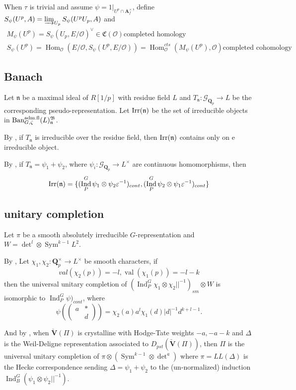 \documentclass[leqno]{amsart}
\newcommand{\smat}[1]{\left( \begin{smallmatrix} #1 \end{smallmatrix} \right)}
\newcommand{\Gp}{\mathcal{G}_{\Qp}} %
\newcommand{\Ban}{\textnormal{Ban}^{\textnormal{adm.fl}}}
\newcommand{\Irr}{\textnormal{Irr}}
\newcommand{\V}{\check{\mathbf{V}}} %
\DeclareMathOperator{\Sym}{Sym}
\DeclareMathOperator{\val}{val}
\newcommand{\Qp}{\mathbf{Q}_p}
\newcommand{\A}{\mathbf A}
\newcommand{\oo}{\mathcal O}
\newcommand{\1}{\mathbf{1}}
\newcommand{\fC}{\mathfrak C}
\newcommand{\B}{\mathfrak B}
\newcommand{\fn}{\mathfrak n}
\DeclareMathOperator{\Hom}{Hom}
\DeclareMathOperator{\Ind}{Ind}
\theoremstyle{definition}
\theoremstyle{remark}
\begin{document}
When $\tau$ is trivial and assume $\psi=1|_{U^p\cap \A_f^\times}$, define
$S_\psi(U^p,A)=\varinjlim_{U_p}S_\psi(U^pU_p,A)$ and
\begin{gather*}
	M_\psi(U^p)=S_\psi(U_p,E/\oo)^{\vee}\in \fC(\oo) \text{completed homology}\\
	S_\psi(U^p)=\Hom_{\oo}(E/\oo, S_\psi(U^p,E/\oo))=
	\Hom_{\oo}^{cts}(M_\psi(U^p), \oo) \text{completed cohomology}
\end{gather*}

\subsection{Banach}

Let $\fn$ be a maximal ideal of  $R[1/p]$
with residue field  $L$ and 
$T_\fn\colon \Gp\to L$ 
be the corresponding pseudo-representation.
Let  $\Irr(\fn)$
be the set of irreducible objects in  $\Ban_{G,\zeta}(L)^\B_{\fn}$.


By \cite[Cor 8.14]{pask}, 
if $T_\fn$ is irreducible over the residue field, 
then $\Irr(\fn)$ contains only on e irreducible object.

By \cite[Cor 8.15]{pask}, 
if $T_\fn=\psi_1+\psi_2$,
where  $\psi_i\colon \Gp\to L^\times$
are continuous homomorphisms, then  
\[
	\Irr(\fn)=\{(\Ind_P^G\psi_1\otimes\psi_2\varepsilon^{-1})_{cont},
	(\Ind_P^G\psi_2\otimes\psi_1\varepsilon^{-1})_{cont}\}
\]

\subsection{unitary completion}

Let $\pi$ be a smooth absolutely irreducible
$G$-representation
and  $W=\det^l\otimes\Sym^{k-1}L^2$. 

By \cite[Thm 12.3]{pask}, 
Let $\chi_1,\chi_2\colon \Qp^\times\to L^\times$
be smooth characters, 
if 
\[
	val(\chi_2(p))=-l, \val(\chi_1(p))=-l-k
\]
then the universal unitary completion of
$(\Ind_P^G\chi_1\otimes\chi_2||^{-1})_{sm}\otimes W$ 
is isomorphic to $\Ind_P^G\psi)_{cont}$, where
\[
	\psi(\smat{a&*\\&d})=\chi_2(a)a^l\chi_1(d)|d|^{-1}d^{k+l-1}.
\]


And by \cite[Thm. 1.3]{CDP},
when $\V(\Pi)$ is crystalline with Hodge-Tate weights $-a,-a-k$
and  $\Delta$ is the Weil-Deligne representation 
associated to  $D_{pst}(\V(\Pi))$,
then $\Pi$ is the universal unitary completion
of  $\pi\otimes(\Sym^{k-1}\otimes \det^a)$
where $\pi=LL(\Delta)$ is the
Hecke correspondence sending  $\Delta=\psi_1+\psi_2$
to the (un-normalized) induction
 $\Ind_B^G(\psi_1\otimes\psi_2||^{-1})$.
\end{document}
